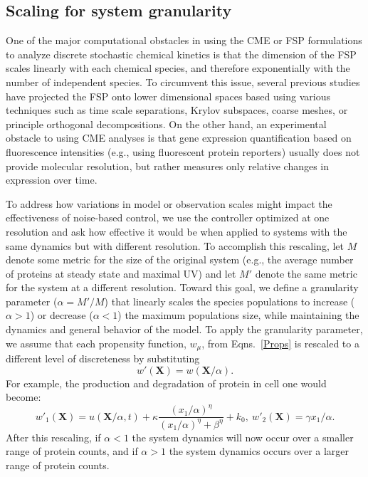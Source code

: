 \documentclass[12pt]{article}
\begin{document}
\subsection{Scaling for system granularity}
One of the major computational obstacles in using the CME or FSP formulations to analyze discrete stochastic chemical kinetics is that the dimension of the FSP scales linearly with each chemical species, and therefore exponentially with the number of independent species. To circumvent this issue, several previous studies have projected the FSP onto lower dimensional spaces based using various techniques such as time scale separations\cite{Peles2006}, Krylov subspaces\cite{Macnemara&Sidje?}, coarse meshes\cite{Munsky2008IEEE,Tapia2012CDC}, or principle orthogonal decompositions\cite{Vo2019}.
On the other hand, an experimental obstacle to using CME analyses is that gene expression quantification based on fluorescence intensities (e.g., using fluorescent protein reporters) usually does not provide molecular resolution, but rather measures only relative changes in expression over time.

To address how variations in model or observation scales might impact the effectiveness of noise-based control, we use the controller optimized at one resolution and ask how effective it would be when applied to systems with the same dynamics but with different resolution. 
To accomplish this rescaling, let $M$ denote some metric for the size of the original system (e.g., the average number of proteins at steady state and maximal UV) and let $M'$ denote the same metric for the system at a different resolution.  
Toward this goal, we define a granularity parameter ($\alpha=M'/M$) that linearly scales the species populations to increase ($\alpha>1$) or decrease ($\alpha<1$) the maximum populations size, while maintaining the dynamics and general behavior of the model. To apply the granularity parameter, we assume that each propensity function, $w_{\mu}$, from Eqns.\ \ref{Props} is rescaled to a different level of discreteness by substituting
\begin{equation}
w'(\mathbf{X})=w(\mathbf{X}/\alpha).
\end{equation}
For example, the production and degradation of protein in cell one would become:
\begin{equation}
w'_1(\mathbf{X}) = u(\mathbf{X}/\alpha,t)  + \kappa \frac{(x_1/\alpha)^\eta}{(x_1/\alpha)^{\eta}+\beta^{\eta}} + k_0,\ w'_2(\mathbf{X}) = \gamma x_1/\alpha.
\end{equation}
After this rescaling, if $\alpha<1 $ the system dynamics will now occur over a smaller range of protein counts, and if $\alpha >1$ the system dynamics occurs over a larger range of protein counts. 
\end{document}
